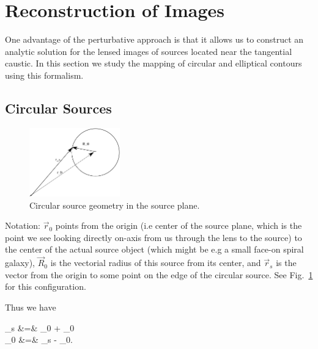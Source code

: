 

\section{Reconstruction of Images}

One advantage of the perturbative approach is that it allows us to
construct an analytic solution for the lensed images of sources
located near the tangential caustic.  In this section we study the
mapping of circular and elliptical contours using this formalism.

\subsection{Circular Sources}

\begin{figure}
  \begin{center}
   \includegraphics[width=0.35\textwidth]{graphics/sourceplane.pdf}
  \end{center}
    \caption{\label{fig:circular_source}Circular source geometry in the source
plane.}
\end{figure}

Notation: $ \vec{r}_{0}$ points from the origin (i.e center of the
source plane, which is the point we see looking directly on-axis from
us through the lens to the source) to the center of the actual source
object (which might be e.g a small face-on spiral galaxy), $
\vec{R}_{0}$ is the vectorial radius of this source from its center,
and $ \vec{r}_{s}$ is the vector from the origin to some point on the
edge of the circular source. See Fig.~\ref{fig:circular_source} for this
configuration.



Thus we have

\bea
{}_s &=&  _{0} + _{0} \\
  _{0} &=& _s - _{0}. \nonumber
\eea


